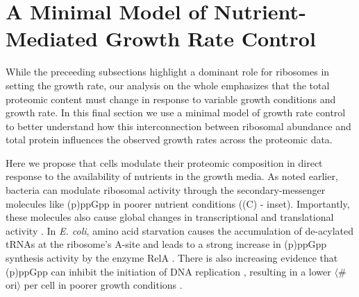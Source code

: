 \section{A Minimal Model of Nutrient-Mediated Growth Rate Control}
While the preceeding subsections highlight a dominant role for ribosomes in
setting the growth rate, our analysis on the whole emphasizes that the total
proteomic content must change in response to variable growth conditions and
growth rate. In this final section we use a minimal model of growth rate control
to better understand how this interconnection between ribosomal abundance and
total protein influences the observed growth rates across the proteomic data.

Here we propose that cells modulate their proteomic composition in direct
response to the availability of nutrients in the growth media. As noted earlier,
bacteria can modulate ribosomal activity through the secondary-messenger
molecules like (p)ppGpp in poorer nutrient conditions ((C) -
inset). Importantly, these molecules also cause global changes in
transcriptional and translational activity \citep{hauryliuk2015, zhu2019,
Buke2020}. In \textit{E. coli}, amino acid starvation causes the accumulation of
de-acylated tRNAs at the ribosome's A-site and leads to a strong increase in
(p)ppGpp synthesis activity by the enzyme RelA \citep{hauryliuk2015}. There is
also increasing evidence that (p)ppGpp can inhibit the initiation of DNA
replication \citep{kraemer2019}, resulting in a lower $\langle$\# ori$\rangle$
per cell in poorer growth conditions \citep{fernandezcoll2020}.


%



